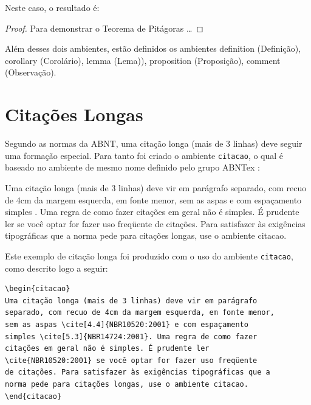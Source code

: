 Neste caso, o resultado é:
\begin{proof}
Para demonstrar o Teorema de Pitágoras \dots
\end{proof}

Além desses dois ambientes, estão definidos os ambientes \textsf{definition} (Definição), \textsf{corollary} (Corolário), \textsf{lemma} (Lema)), \textsf{proposition} (Proposição), \textsf{comment} (Observação).

\section{Citações Longas}
\label{sec:citacoes}

Segundo as normas da ABNT, uma citação longa (mais de 3 linhas) deve seguir uma formação especial. Para tanto foi criado o ambiente \verb|citacao|, o qual é baseado no ambiente de mesmo nome definido pelo grupo ABNTex \cite{abnt-classe-doc}:
\begin{citacao}
Uma citação longa (mais de 3 linhas) deve vir em parágrafo separado,
com recuo de 4cm da margem esquerda, em fonte menor, sem as aspas
\cite[4.4]{NBR10520:2001} e com espaçamento simples \cite[5.3]{NBR14724:2001}.
Uma regra de como fazer citações em geral não é simples. É prudente
ler \cite{NBR10520:2001} se você optar for fazer uso freqüente de citações.
Para satisfazer às exigências tipográficas que a norma pede para
citações longas, use o ambiente citacao.
\end{citacao}

Este exemplo de citação longa foi produzido com o uso do ambiente \verb|citacao|, como descrito logo a seguir:

\begin{verbatim}
\begin{citacao}
Uma citação longa (mais de 3 linhas) deve vir em parágrafo
separado, com recuo de 4cm da margem esquerda, em fonte menor,
sem as aspas \cite[4.4]{NBR10520:2001} e com espaçamento
simples \cite[5.3]{NBR14724:2001}. Uma regra de como fazer
citações em geral não é simples. É prudente ler
\cite{NBR10520:2001} se você optar for fazer uso freqüente
de citações. Para satisfazer às exigências tipográficas que a
norma pede para citações longas, use o ambiente citacao.
\end{citacao}
\end{verbatim}


